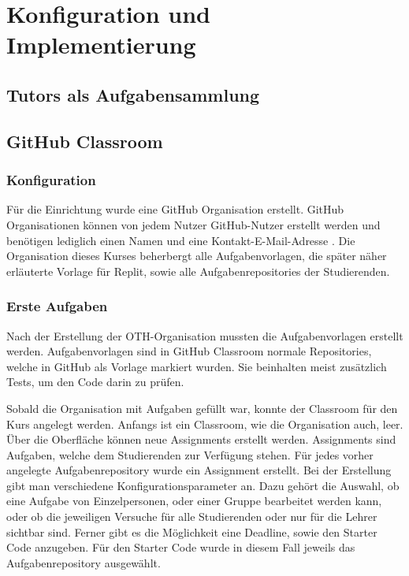 \section{Konfiguration und Implementierung}\label{konfiguration-u-impl}

\subsection{Tutors als Aufgabensammlung}\label{tutors-als-aufgabensammlung}

\subsection{GitHub Classroom}\label{github-classroom}
\subsubsection{Konfiguration}\label{classroom-konfiguration}
Für die Einrichtung wurde eine GitHub Organisation erstellt. GitHub
Organisationen können von jedem Nutzer GitHub-Nutzer erstellt werden und
benötigen lediglich einen Namen und eine Kontakt-E-Mail-Adresse
\parencite{github-organisation-erstellen}. Die Organisation dieses Kurses beherbergt
alle Aufgabenvorlagen, die später näher erläuterte Vorlage für Replit, sowie
alle Aufgabenrepositories der Studierenden.

\subsubsection{Erste Aufgaben}\label{classroom-erste-aufgaben}
Nach der Erstellung der OTH-Organisation mussten die Aufgabenvorlagen erstellt
werden. Aufgabenvorlagen sind in GitHub Classroom normale Repositories, welche
in GitHub als Vorlage markiert wurden. Sie beinhalten meist zusätzlich Tests, um
den Code darin zu prüfen.

Sobald die Organisation mit Aufgaben gefüllt war, konnte der
\glqq Classroom\grqq{} für den Kurs angelegt werden. Anfangs ist ein Classroom,
wie die Organisation auch, leer. Über die Oberfläche können neue Assignments
erstellt werden. Assignments sind Aufgaben, welche dem Studierenden zur
Verfügung stehen. Für jedes vorher angelegte Aufgabenrepository wurde ein
Assignment erstellt. Bei der Erstellung gibt man verschiedene
Konfigurationsparameter an. Dazu gehört die Auswahl, ob eine Aufgabe von
Einzelpersonen, oder einer Gruppe bearbeitet werden kann, oder ob die jeweiligen
Versuche für alle Studierenden oder nur für die Lehrer sichtbar sind. Ferner
gibt es die Möglichkeit eine Deadline, sowie den Starter Code anzugeben. Für den
Starter Code wurde in diesem Fall jeweils das Aufgabenrepository ausgewählt.
\parencite{github-assignment-erstellen}
